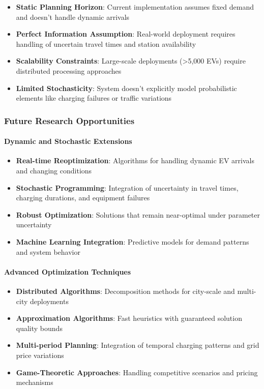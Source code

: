 \documentclass[12pt,a4paper]{article}
\begin{document}
\begin{itemize}
    \item \textbf{Static Planning Horizon}: Current implementation assumes fixed demand and doesn't handle dynamic arrivals
    \item \textbf{Perfect Information Assumption}: Real-world deployment requires handling of uncertain travel times and station availability
    \item \textbf{Scalability Constraints}: Large-scale deployments (>5,000 EVs) require distributed processing approaches
    \item \textbf{Limited Stochasticity}: System doesn't explicitly model probabilistic elements like charging failures or traffic variations
\end{itemize}

\subsubsection{Future Research Opportunities}

\paragraph{Dynamic and Stochastic Extensions}
\begin{itemize}
    \item \textbf{Real-time Reoptimization}: Algorithms for handling dynamic EV arrivals and changing conditions
    \item \textbf{Stochastic Programming}: Integration of uncertainty in travel times, charging durations, and equipment failures
    \item \textbf{Robust Optimization}: Solutions that remain near-optimal under parameter uncertainty
    \item \textbf{Machine Learning Integration}: Predictive models for demand patterns and system behavior
\end{itemize}

\paragraph{Advanced Optimization Techniques}
\begin{itemize}
    \item \textbf{Distributed Algorithms}: Decomposition methods for city-scale and multi-city deployments
    \item \textbf{Approximation Algorithms}: Fast heuristics with guaranteed solution quality bounds
    \item \textbf{Multi-period Planning}: Integration of temporal charging patterns and grid price variations
    \item \textbf{Game-Theoretic Approaches}: Handling competitive scenarios and pricing mechanisms
\end{itemize}
\end{document}
